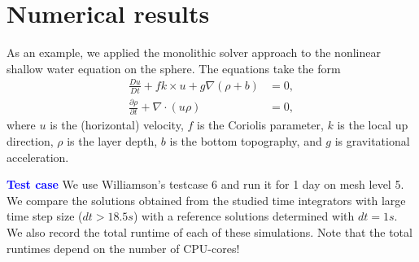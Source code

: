 \documentclass[a4paper,10pt]{article}
\newcommand{\DD}[2]{\frac{D #1}{D #2}}
\newcommand{\pp}[2]{\frac{\partial #1}{\partial #2}}
\begin{document}
\section{Numerical results}


As an example, we applied the monolithic solver approach
to the nonlinear shallow water equation on the sphere.
The equations take the form
 \begin{align*}
   \DD{u}{t} + fk\times u + g \nabla (\rho+b)    & = 0, \\
   \pp{\rho}{t} + \nabla\cdot(u\rho) & = 0,
 \end{align*}
where $u$ is the (horizontal) velocity, $f$ is the Coriolis parameter,
$k$ is the local up direction, $\rho$ is the layer depth, $b$ is the
bottom topography, and $g$ is gravitational acceleration.


\noindent \textcolor{blue}{\textbf{Test case}}
We use Williamson's testcase 6 and run it for 1 day on mesh level 5.
We compare the solutions obtained from the studied time integrators with
large time step size ($dt >18.5s$) with a reference solutions determined with $dt=1s$.
We also record the total runtime of each of these simulations.
Note that the total runtimes depend on the number of CPU-cores!
\vspace{0.6cm}
\end{document}
